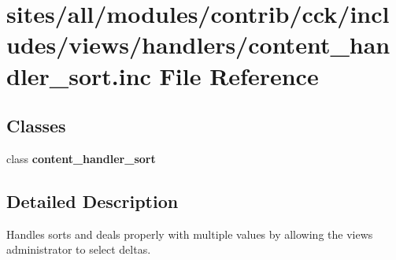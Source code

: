 \hypertarget{content__handler__sort_8inc}{
\section{sites/all/modules/contrib/cck/includes/views/handlers/content\_\-handler\_\-sort.inc File Reference}
\label{content__handler__sort_8inc}
}
\subsection*{Classes}
\begin{CompactItemize}
\item 
class \textbf{content\_\-handler\_\-sort}
\end{CompactItemize}


\subsection{Detailed Description}
Handles sorts and deals properly with multiple values by allowing the views administrator to select deltas. 
